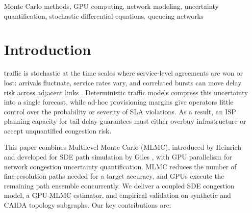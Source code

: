 \documentclass{ieeeaccess}
\begin{document}
\begin{keywords}
Monte Carlo methods, GPU computing, network modeling, uncertainty quantification,
stochastic differential equations, queueing networks
\end{keywords}

\titlepgskip=-15pt

\maketitle

\section{Introduction}

 traffic is stochastic at the time scales where service-level agreements
are won or lost: arrivals fluctuate, service rates vary, and correlated bursts can move delay risk
across adjacent links \cite{kelly2011stochastic, whitt2002, cisco2023annual}. Deterministic traffic
models compress this uncertainty into a single forecast, while ad-hoc provisioning margins give
operators little control over the probability or severity of SLA violations. As a result, an ISP
planning capacity for tail-delay guarantees must either overbuy infrastructure or accept
unquantified congestion risk.

This paper combines Multilevel Monte Carlo (MLMC), introduced by Heinrich
\cite{heinrich2001multilevel} and developed for SDE path simulation by Giles
\cite{giles2008multilevel}, with GPU parallelism for network congestion uncertainty
quantification. MLMC reduces the number of fine-resolution paths needed for a target accuracy,
and GPUs execute the remaining path ensemble concurrently. We deliver a coupled SDE congestion
model, a GPU-MLMC estimator, and empirical validation on synthetic and CAIDA topology subgraphs.
Our key contributions are:
\end{document}
